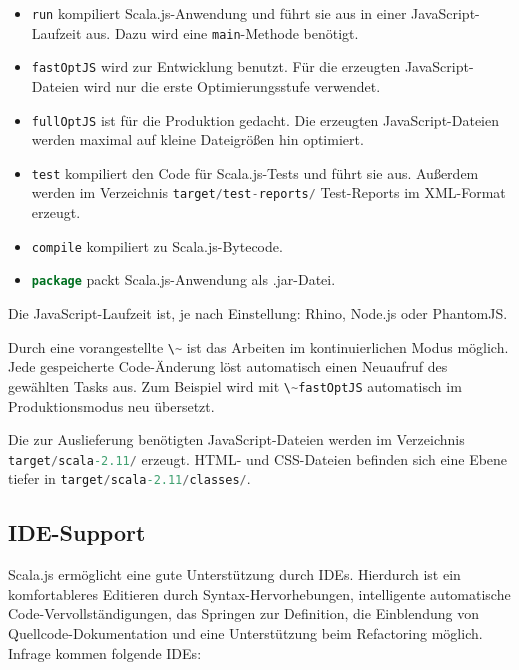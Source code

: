 \documentclass[a4paper, 12pt, hidelinks, listof=totoc, listoftables=totoc, bibliography=totoc]{scrreprt}
\newcommand{\code}[1]{\lstinline[language=Scala, style=inline]|#1|}
\begin{document}
\begin{itemize}
\item \code{run} kompiliert Scala.js-Anwendung und führt sie aus in einer JavaScript-Laufzeit aus. Dazu wird eine \code{main}-Methode benötigt.
\item \code{fastOptJS} wird zur Entwicklung benutzt. Für die erzeugten JavaScript-Dateien wird nur die erste Optimierungsstufe verwendet.
\item \code{fullOptJS} ist für die Produktion gedacht. Die erzeugten JavaScript-Dateien werden maximal auf kleine Dateigrößen hin optimiert.
\item \code{test} kompiliert den Code für Scala.js-Tests und führt sie aus. Außerdem werden im Verzeichnis \code{target/test-reports/} Test-Reports im \ac{XML}-Format erzeugt.
\item \code{compile} kompiliert zu Scala.js-Bytecode.
\item \code{package} packt Scala.js-Anwendung als .jar-Datei.
\end{itemize}

Die JavaScript-Laufzeit ist, je nach Einstellung: Rhino, Node.js oder PhantomJS.

Durch eine vorangestellte \code{\~} ist das Arbeiten im kontinuierlichen Modus möglich. Jede gespeicherte Code-Änderung löst automatisch einen Neuaufruf des gewählten Tasks aus. Zum Beispiel wird mit \code{\~fastOptJS} automatisch im Produktionsmodus neu übersetzt. \cite[\#TheCommandLine]{haoyi.HOS}

Die zur Auslieferung benötigten JavaScript-Dateien werden im Verzeichnis 
\linebreak\mbox{\code{target/scala-2.11/}} erzeugt. \ac{HTML}- und \ac{CSS}-Dateien befinden sich eine Ebene tiefer in \linebreak\mbox{\code{target/scala-2.11/classes/}}.



\subsection{IDE-Support}\label{subsec:sjs-ide}

Scala.js ermöglicht eine gute Unterstützung durch \ac{IDE}s. Hierdurch ist ein komfortableres Editieren durch Syntax-Hervorhebungen, intelligente automatische Code-Vervollständigungen, das Springen zur Definition, die Einblendung von Quellcode-Dokumentation und eine Unterstützung beim Refactoring möglich. \cite{doeraene2015.SNL} Infrage kommen folgende \ac{IDE}s:
\end{document}
